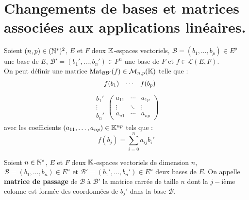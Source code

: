 \section{Changements de bases et matrices associées aux applications linéaires.}

\begin{definition}
    Soient $(n,p) \in (\mathbb{N}^*)^2$, $E$ et $F$ deux $\mathbb{K}$-espaces vectoriels, $\mathcal{B} = (b_1, \ldots, b_p) \in E^p$ une base de $E$, $\mathcal{B}' = (b_1', \ldots, b_n') \in F^n$ une base de $F$ et $f \in \mathcal{L}(E, F)$.
    \\
    On peut définir une matrice $\operatorname{Mat}_{\mathcal{B}\mathcal{B}'} (f) \in \mathcal{M}_{n,p}(\mathbb{K})$ telle que :
    \begin{align*}
        \hspace{0.4cm}
        \begin{matrix}
            f(b_1) & \cdots & f(b_p) 
        \end{matrix}
    \end{align*}
    \vspace{-0.8cm}
    \begin{align*}
        \begin{matrix}
            b_1' \\
            \vdots \\ 
            b_n'
        \end{matrix}
        \begin{pmatrix}
            a_{11} & \cdots & a_{1p} \\
            \vdots & \ddots & \vdots \\ 
            a_{n1} & \cdots & a_{np}
        \end{pmatrix}
    \end{align*}
    avec les coefficients $(a_{11}, \ldots, a_{np}) \in \mathbb{K}^{np}$ tels que : 
    \[ f(b_j) = \sum_{i = 0}^n a_{ij} b_i' \]
\end{definition}

\begin{definition}
    Soient $n \in \mathbb{N}^*$, $E$ et $F$ deux $\mathbb{K}$-espaces vectoriels de dimension $n$, $\mathcal{B} = (b_1, \ldots, b_n) \in E^n$ et $\mathcal{B}' = (b_1', \ldots, b_n') \in E^n$ deux bases de $E$. On appelle \textbf{matrice de passage} de $\mathcal{B}$ à $\mathcal{B}'$ la matrice carrée de taille $n$ dont la $j-$ième colonne est formée des coordonnées de $b_j'$ dans la base $\mathcal{B}$.
\end{definition}

